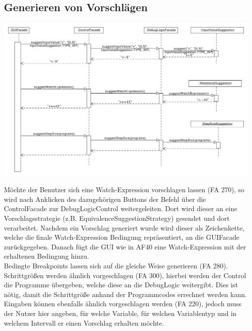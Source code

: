 \documentclass[parskip=full]{scrartcl}
\begin{document}
\subsection{Generieren von Vorschlägen}%
\begin{center}
\includegraphics[width=1.0\textwidth]{diagrammIdeenUmlet/SequenceDiagrams/seq_suggestions.pdf}
\end{center}
Möchte der Benutzer sich eine Watch-Expression vorschlagen lassen (FA 270), so wird nach Anklicken des dazugehörigen Buttons der Befehl über die ControlFacade zur DebugLogicControl weitergeleiten. Dort wird dieser an eine Vorschlagsstrategie (z.B. EquivalenceSuggestionStrategy) gesendet und dort verarbeitet. Nachdem ein Vorschlag generiert wurde wird dieser als Zeichenkette, welche die finale Watch-Expression Bedingung repräsentiert, an die GUIFacade zurückgegeben. Danach fügt die GUI wie in AF40 eine Watch-Expression mit der erhaltenen Bedingung hinzu.
\\
Bedingte Breakpoints lassen sich auf die gleiche Weise generieren (FA 280).
\\
Schrittgrößen werden ähnlich vorgeschlagen (FA 300), hierbei werden der Control die Programme übergeben, welche diese an die DebugLogic weitergibt. Dies ist nötig, damit die Schrittgröße anhand der Programmcodes errechnet werden kann.
\\
Eingaben können ebenfalls ähnlich vorgeschlagen werden (FA 220), jedoch muss der Nutzer hier angeben, für welche Variable, für welchen Variablentyp und in welchem Intervall er einen Vorschlag erhalten möchte.

\newpage
\end{document}

